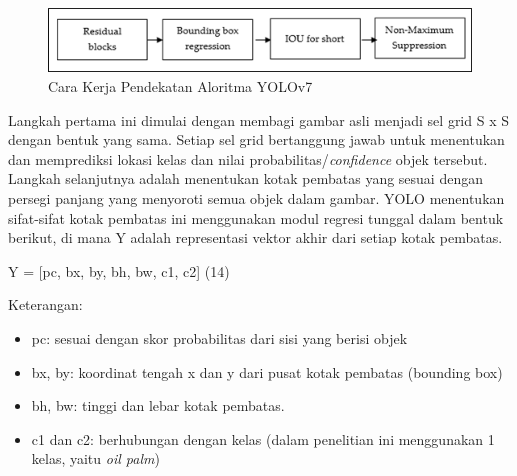 \begin{figure}[H]
	\vspace{-0.1cm}
	\begin{center}
		\includegraphics[width=1\columnwidth]{bab3/Gambar/Picture13.png}
	\end{center}
	\vspace{-0.2cm}
	\captionsetup{justification=centering}
	\caption{Cara Kerja Pendekatan Aloritma YOLOv7}\label{img:Cara-Kerja-Pendekatan-Algoritma-YOLOv7}
\end{figure}

Langkah pertama ini dimulai dengan membagi gambar asli menjadi sel grid S x S dengan bentuk yang sama. Setiap sel grid bertanggung jawab untuk menentukan dan memprediksi lokasi kelas dan nilai probabilitas/\textit{confidence} objek tersebut. Langkah selanjutnya adalah menentukan kotak pembatas yang sesuai dengan persegi panjang yang menyoroti semua objek dalam gambar. YOLO menentukan sifat-sifat kotak pembatas ini menggunakan modul regresi tunggal dalam bentuk berikut, di mana Y adalah representasi vektor akhir dari setiap kotak pembatas.

Y = [pc, bx, by, bh, bw, c1, c2] \hfill (14)

Keterangan:
\begin{itemize}
	\item pc: sesuai dengan skor probabilitas dari sisi yang berisi objek
	
	\item bx, by: koordinat tengah x dan y dari pusat kotak pembatas (bounding box)
	
	\item bh, bw: tinggi dan lebar kotak pembatas.
	
	\item c1 dan c2: berhubungan dengan kelas (dalam penelitian ini menggunakan 1 kelas, yaitu \textit{oil palm})
\end{itemize}

